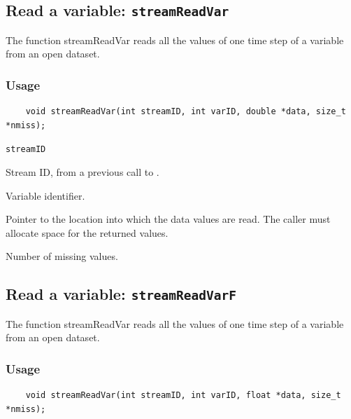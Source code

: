 

\subsection{Read a variable: \texttt{streamReadVar}}
\label{streamReadVar}

The function streamReadVar reads all the values of one time step of a variable
from an open dataset.
\subsubsection*{Usage}

\begin{verbatim}
    void streamReadVar(int streamID, int varID, double *data, size_t *nmiss);
\end{verbatim}

\hspace*{4mm}\begin{minipage}[]{15cm}
\begin{deflist}{\texttt{streamID}\ }
\item[\texttt{streamID}]
Stream ID, from a previous call to {}.
\item[\texttt{varID}]
Variable identifier.
\item[\texttt{data}]
Pointer to the location into which the data values are read.
                     The caller must allocate space for the returned values.
\item[\texttt{nmiss}]
Number of missing values.

\end{deflist}
\end{minipage}


\subsection{Read a variable: \texttt{streamReadVarF}}
\label{streamReadVarF}

The function streamReadVar reads all the values of one time step of a variable
from an open dataset.
\subsubsection*{Usage}

\begin{verbatim}
    void streamReadVar(int streamID, int varID, float *data, size_t *nmiss);
\end{verbatim}

